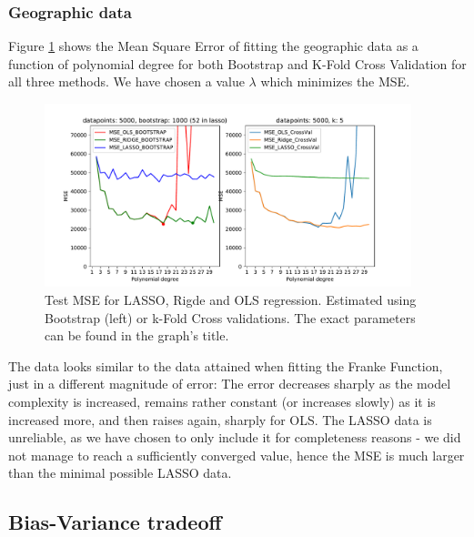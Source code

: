 \documentclass[11pt,a4paper,titlepage]{article}
\begin{document}
\subsubsection{Geographic data}
Figure \ref{fig:MSE_Korea} shows the Mean Square Error of fitting the geographic data as a function of polynomial degree for both Bootstrap and K-Fold Cross Validation for all three methods. We have chosen a value $\lambda$ which minimizes the MSE. 
\begin{figure}[H]
\centering
\includegraphics[width=0.95\textwidth]{figures/presentable_data/MSE_different_methods_Korea.pdf}
\caption[Test MSE for LASSO, Rigde and OLS regression]{Test MSE for LASSO, Rigde and OLS regression. Estimated using Bootstrap (left) or k-Fold Cross validations. The exact parameters can be found in the graph's title.}
\label{fig:MSE_Korea}
\end{figure}
The data looks similar to the data attained when fitting the Franke Function, just in a different magnitude of error: The error decreases sharply as the model complexity is increased, remains rather constant (or increases slowly) as it is increased more, and then raises again, sharply for OLS. The LASSO data is unreliable, as we have chosen to only include it for completeness reasons - we did not manage to reach a sufficiently converged value, hence the MSE is much larger than the minimal possible LASSO data.
\subsection{Bias-Variance tradeoff}
\end{document}
